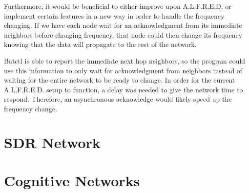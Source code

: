 Furthermore, it would be beneficial to either improve upon A.L.F.R.E.D. or implement certain features in a new way in order to handle the frequency changing. If we have each node wait for an acknowledgment from its immediate neighbors before changing frequency, that node could then change its frequency knowing that the data will propagate to the rest of the network. 

Batctl is able to report the immediate next hop neighbors, so the program could use this information to only wait for acknowledgment from neighbors instead of waiting for the entire network to be ready to change. In order for the current A.L.F.R.E.D. setup to function, a delay was needed to give the network time to respond. Therefore, an asynchronous acknowledge would likely speed up the frequency change. 



\section{SDR Network}


\section{Cognitive Networks}


